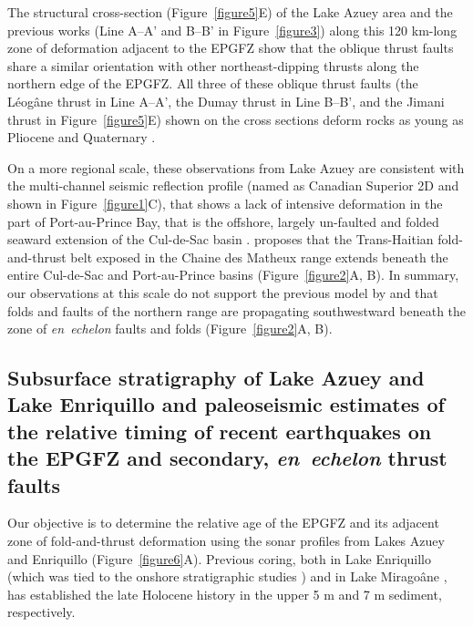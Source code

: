 \documentclass[linenumbers,draft]{agujournal}
\begin{document}
The structural cross-section (Figure~\ref{figure5}E) of the Lake Azuey area and the previous works \citep{bourgueil1988synthese,rathje2011damage,cox2011shear,douilly2015three} (Line A--A' and B--B' in Figure~\ref{figure3}) along this 120 km-long zone of deformation adjacent to the EPGFZ show that the oblique thrust faults share a similar orientation with other northeast-dipping thrusts along the northern edge of the EPGFZ. All three of these oblique thrust faults (the L\'eog\^ane thrust in Line A--A', the Dumay thrust in Line B--B', and the Jimani thrust in Figure~\ref{figure5}E) shown on the cross sections deform rocks as young as Pliocene and Quaternary \citep{saint2015seismotectonics}. 

On a more regional scale, these observations from Lake Azuey are consistent with the multi-channel seismic reflection profile (named as Canadian Superior 2D and shown in Figure~\ref{figure1}C), that shows a lack of intensive deformation in the part of Port-au-Prince Bay, that is the offshore, largely un-faulted and folded seaward extension of the Cul-de-Sac basin \citep{mchugh2011offshore}. \citet{pubellier2000plate} proposes that the Trans-Haitian fold-and-thrust belt exposed in the Chaine des Matheux range extends beneath the entire Cul-de-Sac and Port-au-Prince basins (Figure~\ref{figure2}A, B). In summary, our observations at this scale do not support the previous model by \citet{pubellier2000plate} and \citet{calais2010transpressional} that folds and faults of the northern range are propagating southwestward beneath the zone of \textit{en~echelon} faults and folds (Figure~\ref{figure2}A, B).

\subsection{Subsurface stratigraphy of Lake Azuey and Lake Enriquillo and paleoseismic estimates of the relative timing of recent earthquakes on the EPGFZ and secondary, \textit{en~echelon} thrust faults}
Our objective is to determine the relative age of the EPGFZ and its adjacent zone of fold-and-thrust deformation using the sonar profiles from Lakes Azuey and Enriquillo (Figure~\ref{figure6}A). Previous coring, both in Lake Enriquillo \citep{rios2013holocene} (which was tied to the onshore stratigraphic studies \citep{taylor1985stratigraphy,rios2013holocene}) and in Lake Mirago\^ane \citep{higuera199910}, has established the late Holocene history in the upper 5 m and 7 m sediment, respectively.
\end{document}
